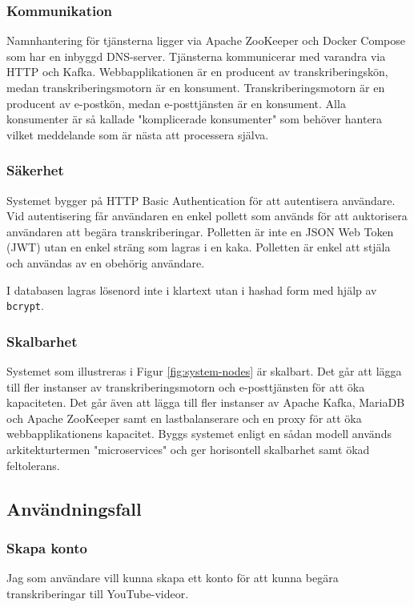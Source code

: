 \subsubsection{Kommunikation}
Namnhantering för tjänsterna ligger via Apache ZooKeeper och Docker Compose som har
en inbyggd DNS-server. Tjänsterna kommunicerar med varandra via HTTP och Kafka.
Webbapplikationen är en producent av transkriberingskön, medan transkriberingsmotorn är en
konsument. Transkriberingsmotorn är en producent av e-postkön, medan e-posttjänsten
är en konsument. Alla konsumenter är så kallade "komplicerade konsumenter" som
behöver hantera vilket meddelande som är nästa att processera själva.

\subsubsection{Säkerhet}
Systemet bygger på HTTP Basic Authentication för att autentisera användare. Vid
autentisering får användaren en enkel pollett som används för att auktorisera
användaren att begära transkriberingar. Polletten är inte en JSON Web Token
(JWT) utan en enkel sträng som lagras i en kaka. Polletten är enkel att stjäla
och användas av en obehörig användare. 

I databasen lagras lösenord inte i klartext utan i hashad form med hjälp av
\verb|bcrypt|. 

\subsubsection{Skalbarhet}
Systemet som illustreras i Figur \ref{fig:system-nodes} är skalbart. Det går
att lägga till fler instanser av transkriberingsmotorn och e-posttjänsten för
att öka kapaciteten. Det går även att lägga till fler instanser av Apache Kafka,
MariaDB och Apache ZooKeeper samt en lastbalanserare och en proxy för att öka
webbapplikationens kapacitet. Byggs systemet enligt en sådan modell används
arkitekturtermen "microservices" och ger horisontell skalbarhet samt ökad
feltolerans. 

\subsection{Användningsfall}

\subsubsection{Skapa konto}
Jag som användare vill kunna skapa ett konto för att kunna begära
transkriberingar till YouTube-videor.

